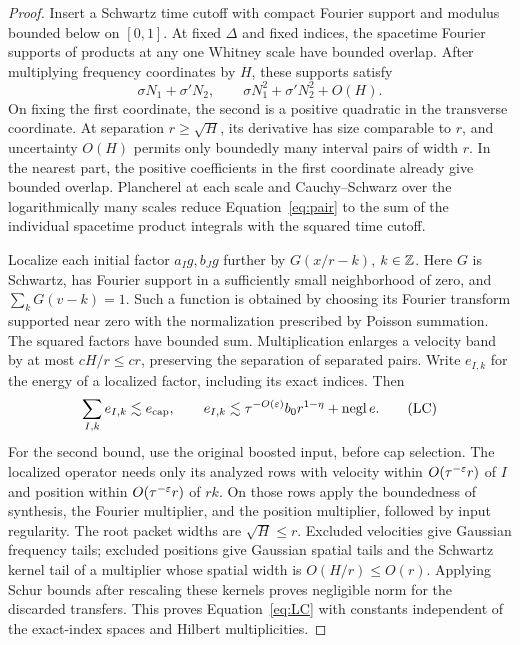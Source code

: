 \begin{proof}
Insert a Schwartz time cutoff with compact Fourier support and modulus
bounded below on $[0,1]$. At fixed $\Delta$ and fixed indices, the
spacetime Fourier supports of products at any one Whitney scale have
bounded overlap. After multiplying frequency coordinates by $H$, these
supports satisfy
\[
 \sigma N_1+\sigma'N_2,\qquad
 \sigma N_1^2+\sigma'N_2^2+O(H).
\]
On fixing the first coordinate, the second is a positive quadratic in
the transverse coordinate. At separation $r\geq\sqrt H$, its derivative
has size comparable to $r$, and uncertainty $O(H)$ permits only
boundedly many interval pairs of width $r$. In the nearest part, the
positive coefficients in the first coordinate already give bounded
overlap. Plancherel at each scale and Cauchy--Schwarz over the
logarithmically many scales reduce Equation~\eqref{eq:pair} to the sum
of the individual spacetime product integrals with the squared time
cutoff.

Localize each initial factor $a_Ig,b_Jg$ further by
$G(x/r-k)$, $k\in\mathbb Z$. Here $G$ is Schwartz, has Fourier support in a
sufficiently small neighborhood of zero, and
$\sum_kG(v-k)=1$. Such a function is obtained by choosing its Fourier
transform supported near zero with the normalization prescribed by
Poisson summation. The squared factors have bounded sum. Multiplication
enlarges a velocity band by at most $cH/r\leq cr$, preserving the
separation of separated pairs. Write $e_{I,k}$ for the energy of a
localized factor, including its exact indices. Then
\begin{equation}
 \sum_{I,k}e_{I,k}\lesssim e_{\rm cap},\qquad
 e_{I,k}\lesssim\tau^{-O(\varepsilon)}b_0r^{1-\eta}
                       +\mathrm{negl}\,e.
 \tag{LC}\label{eq:LC}
\end{equation}
For the second bound, use the original boosted input, before cap
selection. The localized operator needs only its analyzed rows with
velocity within $O(\tau^{-\varepsilon}r)$ of $I$ and position within
$O(\tau^{-\varepsilon}r)$ of $rk$. On those rows apply the boundedness of
synthesis, the Fourier multiplier, and the position multiplier, followed
by input regularity. The root packet widths are $\sqrt H\leq r$.
Excluded velocities give Gaussian frequency tails; excluded positions
give Gaussian spatial tails and the Schwartz kernel tail of a multiplier
whose spatial width is $O(H/r)\leq O(r)$. Applying Schur bounds after
rescaling these kernels proves negligible norm for the discarded
transfers. This proves Equation~\eqref{eq:LC} with constants independent
of the exact-index spaces and Hilbert multiplicities.


\end{proof}
